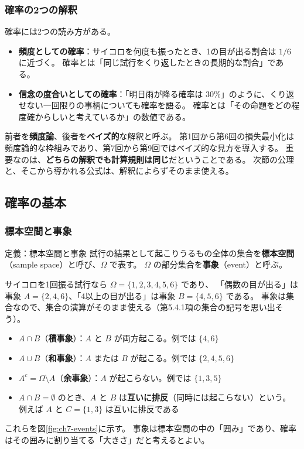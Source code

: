 \subsubsection{確率の2つの解釈}

確率には2つの読み方がある。
\begin{itemize}
  \item \textbf{頻度としての確率}：サイコロを何度も振ったとき、1の目が出る割合は $1/6$ に近づく。
    確率とは「同じ試行をくり返したときの長期的な割合」である。
  \item \textbf{信念の度合いとしての確率}：「明日雨が降る確率は $30\%$」のように、くり返せない一回限りの事柄についても確率を語る。
    確率とは「その命題をどの程度確からしいと考えているか」の数値である。
\end{itemize}
前者を\textbf{頻度論}、後者を\textbf{ベイズ的}な解釈と呼ぶ。
第1回から第6回の損失最小化は頻度論的な枠組みであり、第7回から第9回ではベイズ的な見方を導入する。
重要なのは、\textbf{どちらの解釈でも計算規則は同じ}だということである。
次節の公理と、そこから導かれる公式は、解釈によらずそのまま使える。


\subsection{確率の基本}

\subsubsection{標本空間と事象}

\begin{itembox}[l]{定義：標本空間と事象}
試行の結果として起こりうるもの全体の集合を\textbf{標本空間}（sample space）と呼び、$\Omega$ で表す。
$\Omega$ の部分集合を\textbf{事象}（event）と呼ぶ。
\end{itembox}

サイコロを1回振る試行なら $\Omega = \{1, 2, 3, 4, 5, 6\}$ であり、
「偶数の目が出る」は事象 $A = \{2, 4, 6\}$、「4以上の目が出る」は事象 $B = \{4, 5, 6\}$ である。
事象は集合なので、集合の演算がそのまま使える（第5.4.1項の集合の記号を思い出そう）。
\begin{itemize}
  \item $A \cap B$（\textbf{積事象}）：$A$ と $B$ が両方起こる。例では $\{4, 6\}$
  \item $A \cup B$（\textbf{和事象}）：$A$ または $B$ が起こる。例では $\{2, 4, 5, 6\}$
  \item $A^c = \Omega \setminus A$（\textbf{余事象}）：$A$ が起こらない。例では $\{1, 3, 5\}$
  \item $A \cap B = \emptyset$ のとき、$A$ と $B$ は\textbf{互いに排反}（同時には起こらない）という。
    例えば $A$ と $C = \{1, 3\}$ は互いに排反である
\end{itemize}
これらを図\ref{fig:ch7-events}に示す。
事象は標本空間の中の「囲み」であり、確率はその囲みに割り当てる「大きさ」だと考えるとよい。

